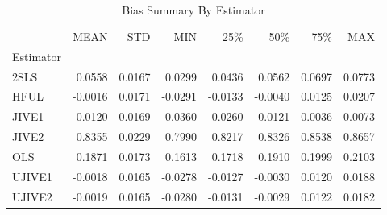 \begin{table}[ht]
\centering
\caption{Bias Summary By Estimator}
\begin{tabular}{lrrrrrrr}
\toprule
 & MEAN & STD & MIN & 25\% & 50\% & 75\% & MAX \\
Estimator &  &  &  &  &  &  &  \\
\midrule
2SLS & 0.0558 & 0.0167 & 0.0299 & 0.0436 & 0.0562 & 0.0697 & 0.0773 \\
HFUL & -0.0016 & 0.0171 & -0.0291 & -0.0133 & -0.0040 & 0.0125 & 0.0207 \\
JIVE1 & -0.0120 & 0.0169 & -0.0360 & -0.0260 & -0.0121 & 0.0036 & 0.0073 \\
JIVE2 & 0.8355 & 0.0229 & 0.7990 & 0.8217 & 0.8326 & 0.8538 & 0.8657 \\
OLS & 0.1871 & 0.0173 & 0.1613 & 0.1718 & 0.1910 & 0.1999 & 0.2103 \\
UJIVE1 & -0.0018 & 0.0165 & -0.0278 & -0.0127 & -0.0030 & 0.0120 & 0.0188 \\
UJIVE2 & -0.0019 & 0.0165 & -0.0280 & -0.0131 & -0.0029 & 0.0122 & 0.0182 \\
\bottomrule
\end{tabular}
\end{table}
